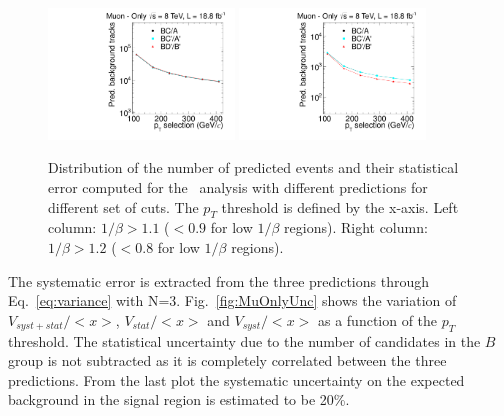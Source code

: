 \begin{figure}
\begin{center}
\includegraphics[clip=true, trim=0.0cm 0cm 3.0cm 0cm,width=0.44\textwidth]{figures/muonly/Data8TeVCollisionPrediction_TOF110}
\includegraphics[clip=true, trim=0.0cm 0cm 3.0cm 0cm,width=0.44\textwidth]{figures/muonly/Data8TeVCollisionPrediction_TOF120}
\caption{Distribution of the number of predicted events and their statistical error computed for the \muononly\ analysis with different predictions for different set of cuts.
The $p_{T}$ threshold is defined by the x-axis.
Left column: $1/\beta>1.1$ ($<0.9$ for low $1/\beta$ regions). Right column: $1/\beta>1.2$ ($<0.8$ for low $1/\beta$ regions).
}
\label{fig:MuOnlycorrelation}
\end{center}
\end{figure}

The systematic error is extracted from the three predictions
through Eq.~\ref{eq:variance} with N=3.
Fig.~\ref{fig:MuOnlyUnc} shows the variation of
$V_{syst+stat}/<x>$, $V_{stat}/<x>$ and $V_{syst}/<x>$
as a function of the $p_T$ threshold. The statistical uncertainty due to the number of candidates in the $B$ group is not subtracted as it is completely correlated
between the three predictions. From the last plot
the systematic uncertainty on the expected background in the signal
region is estimated to be 20\%.

